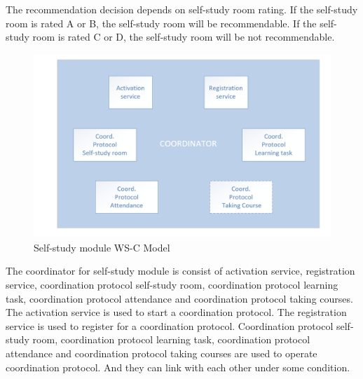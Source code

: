 \documentclass[runningheads]{llncs}
\begin{document}
The recommendation decision depends on self-study room rating. If the self-study room is rated A or B, the self-study room will be recommendable. If the self-study room is rated C or D, the self-study room will be not recommendable.
\begin{figure}[H]
		\centering %
		\includegraphics[width=1.0\textwidth]{./figure/LLT/WSC} %
		\caption{Self-study module WS-C Model} %
		\label{wsc} %
	\end{figure}
The coordinator for self-study module is consist of activation service, registration service, coordination protocol self-study room, coordination protocol learning task, coordination protocol attendance and coordination protocol taking courses. The activation service is used to start a coordination protocol. The registration service is used to register for a coordination protocol. Coordination protocol self-study room, coordination protocol learning task, coordination protocol attendance and coordination protocol taking courses are used to operate coordination protocol. And they can link with each other under some condition.\\
\end{document}

